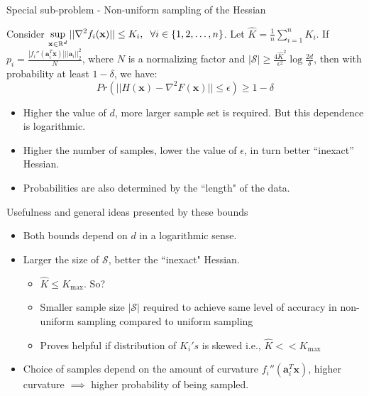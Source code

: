 \documentclass[10pt]{beamer}
\newcommand{\h}{\nabla^{2}}
\newcommand{\xbold}{\mathbf{x}}
\begin{document}
\begin{frame}{Special sub-problem - Non-uniform sampling of the Hessian}
\begin{theorem}
Consider \(\displaystyle \sup_{\xbold\in\mathbb{R}^{d}} ||\h f_{i}(\xbold)|| \leq K_{i}, \hspace{2mm} \forall i \in \{1, 2, \ldots, n\}\). Let \(\hat{K} = \frac{1}{n}\sum_{i=1}^{n} K_{i}\). If \(p_{i} = \displaystyle \frac{|f_{i}''(\mathbf{a}_{i}^{T}\xbold)| ||\mathbf{a}_{i}||^{2}_{2}}{N}\), where \(N\) is a normalizing factor and \(|\mathcal{S}| \geq \frac{4\hat{K}^{2}}{\epsilon^{2}}\log\frac{2d}{\delta}\), then with probability at least \(1 - \delta\), we have:
\begin{equation}
Pr\left(||H(\xbold) - \h F(\xbold)|| \leq \epsilon\right) \geq 1 - \delta
\end{equation}
\end{theorem}
\pause
{}
\begin{itemize}
\item<3->{Higher the value of \(d\), more larger sample set is required. But this dependence is logarithmic.}
\item<4->{Higher the number of samples, lower the value of \(\epsilon\), in turn better ``inexact'' Hessian.}
\item<5->{Probabilities are also determined by the ``length" of the data.}
\end{itemize}
\end{frame}

\begin{frame}{Usefulness and general ideas presented by these bounds}
\begin{itemize}
\item<1->{Both bounds depend on \(d\) in a logarithmic sense.}
\item<2->{Larger the size of \(\mathcal{S}\), better the ``inexact" Hessian.
  \begin{itemize}
    \item<3->{\(\hat{K} \leq K_{\max}\). So?}
    \item<4->{Smaller sample size \(|\mathcal{S}|\) required to achieve same level of accuracy in non-uniform sampling compared to uniform sampling}
    \item<5->{Proves helpful if distribution of \(K_{i}'s\) is skewed i.e., \(\hat{K} << K_{\max}\)}
  \end{itemize}
}
\item<3->{Choice of samples depend on the amount of curvature \(f_{i}''(\mathbf{a}_{i}^{T}\xbold)\), higher curvature \(\implies\) higher probability of being sampled.}
\end{itemize}
\end{frame}
\end{document}
